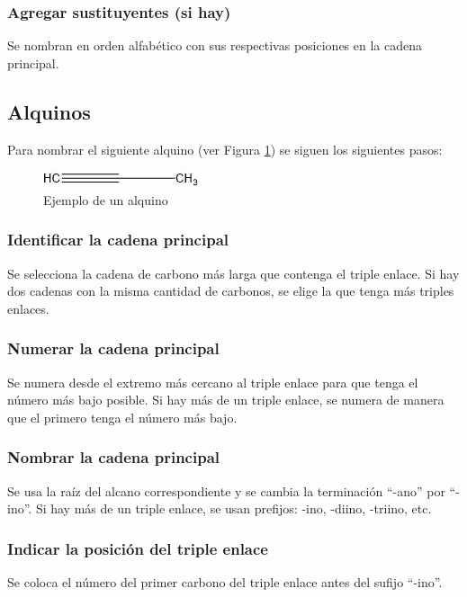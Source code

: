 \documentclass{article}
\begin{document}
\subsubsection{Agregar sustituyentes (si hay)}
Se nombran en orden alfabético con sus respectivas posiciones en la cadena principal.

\subsection{Alquinos}
Para nombrar el siguiente alquino (ver Figura \ref{fig:alquino}) se siguen los siguientes pasos:
\begin{figure}[h]
    \centering
    \includegraphics[width=0.5\linewidth]{media/propino.jpg}
    \caption{Ejemplo de un alquino}
    \label{fig:alquino}
\end{figure}

\subsubsection{Identificar la cadena principal}
Se selecciona la cadena de carbono más larga que contenga el triple enlace. Si hay dos cadenas con la misma cantidad de carbonos, se elige la que tenga más triples enlaces.

\subsubsection{Numerar la cadena principal}
Se numera desde el extremo más cercano al triple enlace para que tenga el número más bajo posible. Si hay más de un triple enlace, se numera de manera que el primero tenga el número más bajo.

\subsubsection{Nombrar la cadena principal}
Se usa la raíz del alcano correspondiente y se cambia la terminación ``-ano'' por ``-ino''. Si hay más de un triple enlace, se usan prefijos: -ino, -diino, -triino, etc.

\subsubsection{Indicar la posición del triple enlace}
Se coloca el número del primer carbono del triple enlace antes del sufijo ``-ino''.
\end{document}
